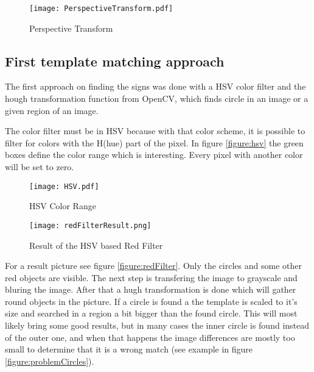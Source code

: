 \begin{figure}[H]
\begin{center}
  \texttt{[image: PerspectiveTransform.pdf]}
  \caption[]{Perspective Transform}
  \label{figure:perspective}
\end{center}
\end{figure}

\subsection{First template matching approach}
The first approach on finding the signs was done with a HSV color filter and the hough transformation
function from OpenCV, which finds circle in an image or a given region of an image.

The color filter must be in HSV because with that color scheme, it is possible to filter for colors
with the H(hue) part of the pixel. In figure \vref{figure:hsv} the green boxes define the color range
which is interesting. Every pixel with another color will be set to zero. 

\begin{figure}[htp]
\begin{center}
  \texttt{[image: HSV.pdf]}
  \caption{HSV Color Range}
  \label{figure:hsv}
\end{center}
\end{figure}


\begin{figure}[htp]
\begin{center}
  \texttt{[image: redFilterResult.png]}
  \caption{Result of the HSV based Red Filter}
  \label{figure:redFilter}
\end{center}
\end{figure}


For a result picture see figure \vref{figure:redFilter}. 
Only the circles and some other red objects are visible. 
The next step is transfering the image to grayscale and 
bluring the image. After that a hugh transformation is done which will gather round
objects in the picture. If a circle is found a the template is scaled to it's size and 
searched in a region a bit bigger than the found circle. This will most likely bring some good results, 
but in many cases the inner circle is found instead of the outer one, and when that happens the image 
differences are mostly too small to determine that it is a wrong match
(see example in figure \vref{figure:problemCircles}).

